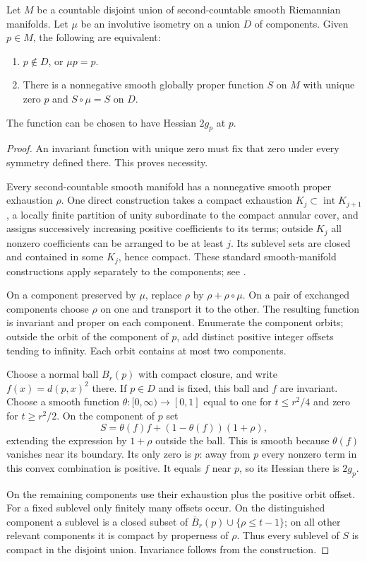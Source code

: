 \begin{theorem}\label{thm:selection}
Let $M$ be a countable disjoint union of second-countable smooth
Riemannian manifolds. Let $\mu$ be an involutive isometry on a union $D$
of components. Given $p\in M$, the following are equivalent:
\begin{enumerate}[label=(\roman*)]
\item $p\notin D$, or $\mu p=p$.
\item There is a nonnegative smooth globally proper function $S$ on $M$
with unique zero $p$ and $S\circ\mu=S$ on $D$.
\end{enumerate}
The function can be chosen to have Hessian $2g_p$ at $p$.
\end{theorem}
\begin{proof}
An invariant function with unique zero must fix that zero under every
symmetry defined there. This proves necessity.

Every second-countable smooth manifold has a nonnegative smooth proper
exhaustion $\rho$. One direct construction takes a compact exhaustion
$K_j\subset\operatorname{int}K_{j+1}$, a locally finite partition of unity
subordinate to the compact annular cover, and assigns successively increasing
positive coefficients to its terms; outside $K_j$ all nonzero coefficients
can be arranged to be at least $j$. Its sublevel sets are closed and
contained in some $K_j$, hence compact. These standard smooth-manifold
constructions apply separately to the components; see \cite{Lee}.

On a component preserved by $\mu$, replace $\rho$ by
$\rho+\rho\circ\mu$. On a pair of exchanged components choose $\rho$ on
one and transport it to the other. The resulting function is invariant
and proper on each component. Enumerate the component orbits; outside
the orbit of the component of $p$, add distinct positive integer offsets
tending to infinity. Each orbit contains at most two components.

Choose a normal ball $B_r(p)$ with compact closure, and write
$f(x)=d(p,x)^2$ there. If $p\in D$ and is fixed, this ball and $f$ are
invariant. Choose a smooth function $\theta:[0,\infty)\to[0,1]$ equal to
one for $t\le r^2/4$ and zero for $t\ge r^2/2$. On the component of $p$ set
\[
 S=\theta(f)f+(1-\theta(f))(1+\rho),
\]
extending the expression by $1+\rho$ outside the ball. This is smooth
because $\theta(f)$ vanishes near its boundary. Its only zero is $p$:
away from $p$ every nonzero term in this convex combination is positive.
It equals $f$ near $p$, so its Hessian there is $2g_p$.

On the remaining components use their exhaustion plus the positive
orbit offset. For a fixed sublevel only finitely many offsets occur.
On the distinguished component a sublevel is a closed subset of
$\overline B_r(p)\cup\{\rho\le t-1\}$; on all other relevant components
it is compact by properness of $\rho$. Thus every sublevel of $S$ is
compact in the disjoint union. Invariance follows from the construction.
\end{proof}

